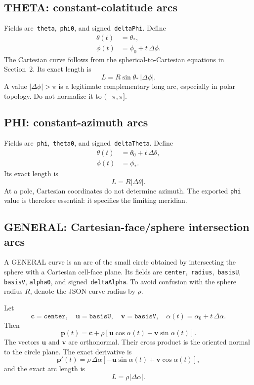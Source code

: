 \documentclass[11pt]{article}
\newcommand{\field}[1]{\texttt{#1}}
\newcommand{\vect}[1]{\boldsymbol{#1}}
\begin{document}
\subsection{THETA: constant-colatitude arcs}

Fields are \,\field{theta}, \,\field{phi0}, and signed \,\field{deltaPhi}.
Define
\begin{align}
  \theta(t)&=\theta_*,\\
  \phi(t)&=\phi_0+t\,\Delta\phi.
\end{align}
The Cartesian curve follows from the spherical-to-Cartesian equations in
Section~2.  Its exact length is
\[
  L=R\sin\theta_*\,|\Delta\phi|.
\]
A value $|\Delta\phi|>\pi$ is a legitimate complementary long arc, especially
in polar topology.  Do not normalize it to $(-\pi,\pi]$.

\subsection{PHI: constant-azimuth arcs}

Fields are \,\field{phi}, \,\field{theta0}, and signed
\,\field{deltaTheta}.  Define
\begin{align}
  \theta(t)&=\theta_0+t\,\Delta\theta,\\
  \phi(t)&=\phi_*.
\end{align}
Its exact length is
\[
  L=R|\Delta\theta|.
\]
At a pole, Cartesian coordinates do not determine azimuth.  The exported
\field{phi} value is therefore essential: it specifies the limiting meridian.

\subsection{GENERAL: Cartesian-face/sphere intersection arcs}

A GENERAL curve is an arc of the small circle obtained by intersecting the
sphere with a Cartesian cell-face plane.  Its fields are
\field{center}, \,\field{radius}, \,\field{basisU}, \,\field{basisV},
\field{alpha0}, and signed \,\field{deltaAlpha}.  To avoid confusion with the
sphere radius $R$, denote the JSON curve radius by $\rho$.

Let
\[
  \vect{c}=\field{center},\quad
  \vect{u}=\field{basisU},\quad
  \vect{v}=\field{basisV},\quad
  \alpha(t)=\alpha_0+t\,\Delta\alpha.
\]
Then
\begin{equation}
  \boxed{
  \vect{p}(t)=\vect{c}+\rho\left[
      \vect{u}\cos\alpha(t)+\vect{v}\sin\alpha(t)
  \right].}
  \label{eq:general-curve}
\end{equation}
The vectors $\vect{u}$ and $\vect{v}$ are orthonormal.  Their cross product is
the oriented normal to the circle plane.  The exact derivative is
\begin{equation}
  \vect{p}'(t)=\rho\,\Delta\alpha\left[
      -\vect{u}\sin\alpha(t)+\vect{v}\cos\alpha(t)
  \right],
  \label{eq:general-derivative}
\end{equation}
and the exact arc length is
\[
  L=\rho|\Delta\alpha|.
\]
\end{document}
